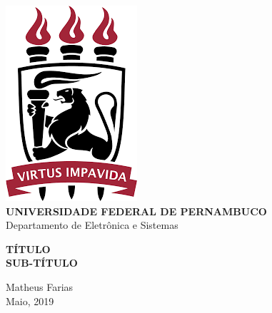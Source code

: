 \begin{titlepage}
    \centering 
    \includegraphics[scale = 0.8]{Imagens/ufpe.png} \\
    \Large{\textbf{UNIVERSIDADE FEDERAL DE PERNAMBUCO}}\\
    \large{Departamento de Eletrônica e Sistemas}

    \Huge\textbf{TÍTULO}\\
    \Large\textbf{SUB-TÍTULO}

    \vfill
    \Large{Matheus Farias} \\
    \Large{Maio, 2019}
\end{titlepage}

\tableofcontents
{}
\mainmatter